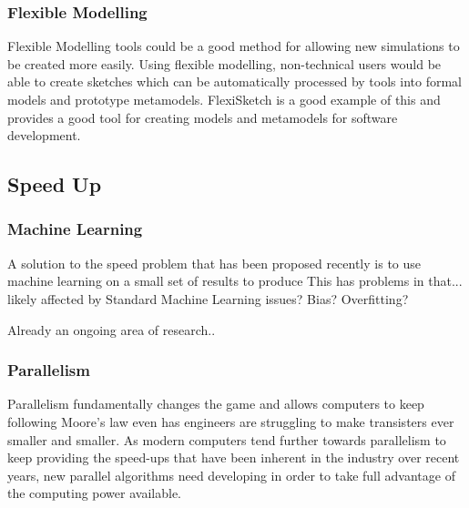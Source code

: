 \documentclass{UoYCSproject}
\begin{document}
\subsubsection{Flexible Modelling}
Flexible Modelling tools could be a good method for allowing new simulations to be created more easily. Using flexible modelling, non-technical users would be able to create sketches which can be automatically processed by tools into formal models and prototype metamodels\cite{Paige2017}. FlexiSketch is a good example of this and provides a good tool for creating models and metamodels for software development\cite{flexisketch}.

\subsection{Speed Up}

\subsubsection{Machine Learning}
A solution to the speed problem that has been proposed recently is to use machine learning on a small set of results to produce\cite{kieran_machine_learning}
This has problems in that...
likely affected by Standard Machine Learning issues? Bias? Overfitting?

Already an ongoing area of research.. 


\subsubsection{Parallelism}
Parallelism fundamentally changes the game and allows computers to keep following Moore's law even has engineers are struggling to make transisters ever smaller and smaller\cite{concurrency_revolution}. As modern computers tend further towards parallelism to keep providing the speed-ups that have been inherent in the industry over recent years, new parallel algorithms need developing in order to take full advantage of the computing power available.
\end{document}
